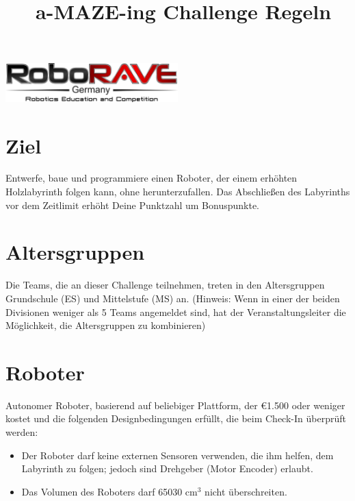\documentclass[a4paper,12pt]{article}
\begin{document}

\title{\tagYear\ a-MAZE-ing Challenge Regeln}
\makeatletter
\let\inserttitle\@title
\makeatother
\begin{center}
	\includegraphics[width=0.5\textwidth]{logo.png}

	\huge                      %
	\bfseries                   %
	\inserttitle
\end{center}

\section{Ziel}
Entwerfe, baue und programmiere einen Roboter, der einem erhöhten Holzlabyrinth
folgen kann, ohne herunterzufallen. Das Abschließen des Labyrinths vor dem
Zeitlimit erhöht Deine Punktzahl um Bonuspunkte.

\section{Altersgruppen}
Die Teams, die an dieser Challenge teilnehmen, treten in den Altersgruppen
Grundschule (ES) und Mittelstufe (MS) an. (Hinweis: Wenn in einer der beiden
Divisionen weniger als 5 Teams angemeldet sind, hat der Veranstaltungsleiter
die Möglichkeit, die Altersgruppen zu kombinieren)

\section{Roboter}
Autonomer Roboter, basierend auf beliebiger Plattform, der \euro{1.500}  oder
weniger kostet und die folgenden Designbedingungen erfüllt, die beim Check-In
überprüft werden:
\begin{itemize}
	\item Der Roboter darf keine externen Sensoren verwenden, die ihm
		helfen, dem Labyrinth zu folgen; jedoch sind Drehgeber (Motor
		Encoder) erlaubt.
	\item Das Volumen des Roboters darf 65030 cm$^{3}$ nicht überschreiten.
\end{itemize}
\end{document}
